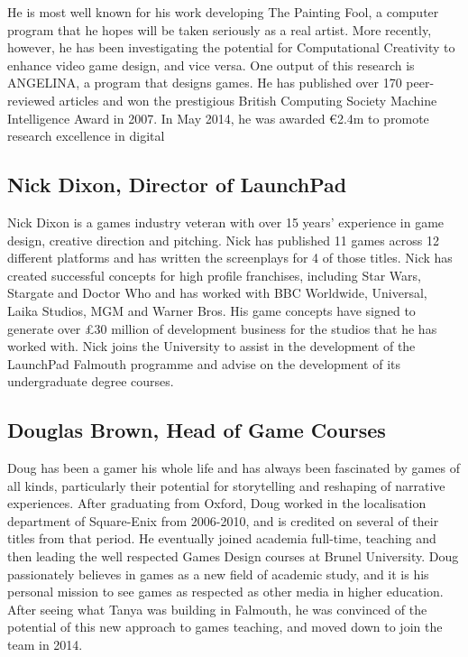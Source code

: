 He is most well known for his work developing The Painting Fool, a computer program that he hopes will be taken seriously as a real artist. More recently, however, he has been investigating the potential for Computational Creativity to enhance video game design, and vice versa. One output of this research is ANGELINA, a program that designs games. He has published over 170 peer-reviewed articles and won the prestigious British Computing Society Machine Intelligence Award in 2007. In May 2014, he was awarded €2.4m to promote research excellence in digital 

\subsection[Nick Dixon]{Nick Dixon, Director of LaunchPad}

Nick Dixon is a games industry veteran with over 15 years' experience in game design, creative direction and pitching. Nick has published 11 games across 12 different platforms and has written the screenplays for 4 of those titles. Nick has created successful concepts for high profile franchises, including Star Wars, Stargate and Doctor Who and has worked with BBC Worldwide, Universal, Laika Studios, MGM and Warner Bros. His game concepts have signed to generate over £30 million of development business for the studios that he has worked with. Nick joins the University to assist in the development of the LaunchPad Falmouth programme and advise on the development of its undergraduate degree courses. 

\subsection[Douglas Brown]{Douglas Brown, Head of Game Courses}

Doug has been a gamer his whole life and has always been fascinated by games of all kinds, particularly their potential for storytelling and reshaping of narrative experiences. After graduating from Oxford, Doug worked in the localisation department of Square-Enix from 2006-2010, and is credited on several of their titles from that period. He eventually joined academia full-time, teaching and then leading the well respected Games Design courses at Brunel University. Doug passionately believes in games as a new field of academic study, and it is his personal mission to see games as respected as other media in higher education. After seeing what Tanya was building in Falmouth, he was convinced of the potential of this new approach to games teaching, and moved down to join the team in 2014. \\

